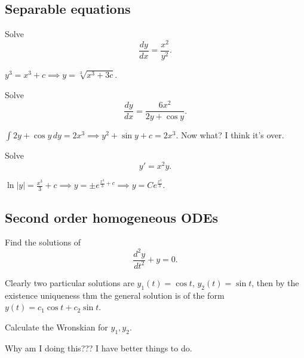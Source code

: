 \subsection{Separable equations}
\begin{prob}
    Solve \[
    \frac{dy}{dx}=\frac{x^2}{y^2}.
    \] 
\end{prob}
\begin{solution}
    $y^3=x^3+c\implies y=\sqrt[3]{x^3+3c} $.
\end{solution}
\begin{prob}
    Solve \[
    \frac{dy}{dx}=\frac{6x^2}{2y+\cos y}.
    \] 
\end{prob}
\begin{solution}
   $\int 2y+\cos y \, dy=2x^3\implies y^2+\sin y+c=2x^3$. Now what? I think it's over.
\end{solution}
\begin{prob}
    Solve  \[
    y'=x^2y.
    \] 
\end{prob}
\begin{solution}
    $\ln|y|=\frac{x^3}{3}+c\implies y=\pm e^{\frac{x^3}{3}+c}\implies y=Ce^{\frac{x^3}{3}}$.
\end{solution}
\subsection{Second order homogeneous ODEs}
\begin{prob}
    Find the solutions of \[
   \frac{d^2y}{dt^2}+y=0.
    \] 
\end{prob}
\begin{solution}
    Clearly two particular solutions are $y_1(t)=\cos t$, $y_2(t)=\sin t$, then by the existence uniqueness thm the general solution is of the form $y(t)=c_1 \cos t+c_2 \sin t$.
\end{solution}
\begin{prob}
    Calculate the Wronskian for $y_1,y_2$.
\end{prob}
\begin{solution}
    Why am I doing this??? I have better things to do.
\end{solution}
